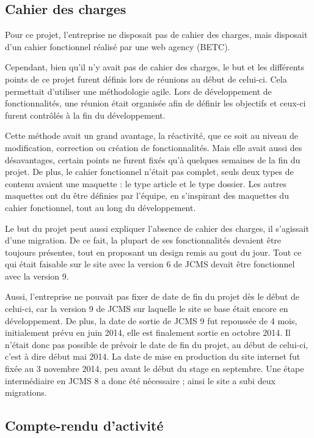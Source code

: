 \documentclass[12pt,a4paper]{article}
\begin{document}
\subsection{Cahier des charges}
Pour ce projet, l'entreprise ne disposait pas de cahier des charges, mais disposait d'un cahier fonctionnel réalisé par une web agency (BETC).\par
Cependant, bien qu'il n'y avait pas de cahier des charges, le but et les différents points de ce projet furent définis lors de réunions au début de celui-ci. Cela permettait d'utiliser une méthodologie agile. Lors de développement de fonctionnalités, une réunion était organisée afin de définir les objectifs et ceux-ci furent contrôlés à la fin du développement.\par 
Cette méthode avait un grand avantage, la réactivité, que ce soit au niveau de modification, correction ou création de fonctionnalités. Mais elle avait aussi des désavantages, certain points ne furent fixés qu'à quelques semaines de la fin du projet. De plus, le cahier fonctionnel n'était pas complet, seuls deux types de contenu avaient une maquette : le type article et le type dossier. Les autres maquettes ont du être définies par l'équipe, en s'inspirant des maquettes du cahier fonctionnel, tout au long du développement. \par 
Le but du projet peut aussi expliquer l'absence de cahier des charges, il s'agissait d'une migration. De ce fait, la plupart de ses fonctionnalités devaient être toujours présentes, tout en proposant un design remis au gout du jour. Tout ce qui était faisable sur le site avec la version 6 de \gls{JCMS} devait être fonctionnel avec la version 9.\par 
Aussi, l'entreprise ne pouvait pas fixer de date de fin du projet dès le début de celui-ci, car la version 9 de \gls{JCMS} sur laquelle le site se base était encore en développement. De plus, la date de sortie de \gls{JCMS} 9 fut repoussée de 4 mois, initialement prévu en juin 2014, elle est finalement sortie en octobre 2014. Il n'était donc pas possible de prévoir le date de fin du projet, au début de celui-ci, c'est à dire début mai 2014. La date de mise en production du site internet fut fixée au 3 novembre 2014, peu avant le début du stage en septembre. Une étape intermédiaire en \gls{JCMS} 8 a donc été nécessaire ; ainsi le site a subi deux migrations.\par
\subsection{Compte-rendu d'activité}
\end{document}
